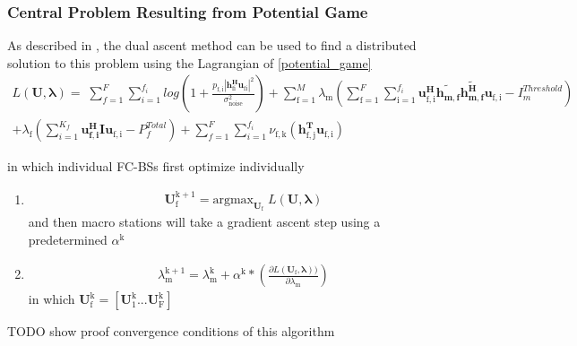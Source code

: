 \documentclass[12pt]{article}
\begin{document}
\subsubsection{Central Problem Resulting from Potential Game}
As described in \cite[p.~8,9]{boyd2011distributed}, the dual ascent method can be used to find a distributed solution to this problem using the Lagrangian of \eqref{potential_game}
\\
\begin{multline}
L(\mathbf{U,\lambda}) = 
\;
\sum_{f=1}^F
\sum_{i=1}^{f_i}
log(1+\frac{p_{ \mathrm{f,i}}|\mathbf{h^H_{\mathrm{fi}}u_{ \mathrm{fi}}}|^2}{\sigma^2_{ \mathrm{noise}} })
+
\sum_{\mathrm{f=1}}^M \lambda_{\mathrm{m}}
(\sum_{\mathrm{f=1}}^F
\sum_{\mathrm{i=1}}^{f_i}
\mathbf{u_{ \mathrm{f,i}}^H} \mathbf{\tilde{h_{m,f}}} \mathbf{\tilde{h_{m,f}^H}} \mathbf{u_{\mathrm{f,i}}} - I^{Threshold}_{m} )
\\
+ 
\lambda_{\mathrm{f}}(
\sum_{i=1}^{K_f}\mathbf{u_{f,i}^H} \mathbf{I} \mathbf{u_{\mathrm{f,i}}} -  P^{Total}_{f})
+
\sum_{f=1}^F
\sum_{i=1}^{f_i}
\nu_{\mathrm{f,k}}(\mathbf{h^T_{\mathrm{f,j}}}\mathbf{u_{\mathrm{f,i}}})
\end{multline}

in which individual FC-BSs first optimize individually
\begin{enumerate}
\item 
\begin{gather}
\mathbf{U^{\mathrm{k+1}}_{\mathrm{f}}} =\mathrm{argmax}_{\mathbf{U_{\mathrm{f}}}} \; L(\mathbf{U,\lambda})
\end{gather}
and then macro stations will take a gradient ascent step using a 
predetermined $\alpha^{\mathrm{k}}$
\item 
\begin{gather}
\lambda_{\mathrm{m}}^{\mathrm{k+1}} = 
\lambda_{\mathrm{m}}^{\mathrm{k}}
+
\alpha^{\mathrm{k}}*
(\frac{\partial L(\mathbf{\mathbf{U_{\mathrm{f}}},\lambda}) )}{\partial\lambda_{\mathrm{m}}})
\end{gather}
in which $\mathbf{U^{\mathrm{k}}_{\mathrm{f}}} = [\mathbf{U^{\mathrm{k}}_{\mathrm{1}}}...\mathbf{U^{\mathrm{k}}_{\mathrm{F}}}]$

\end{enumerate} 

TODO show proof convergence conditions of this algorithm
\newpage

\end{document}
